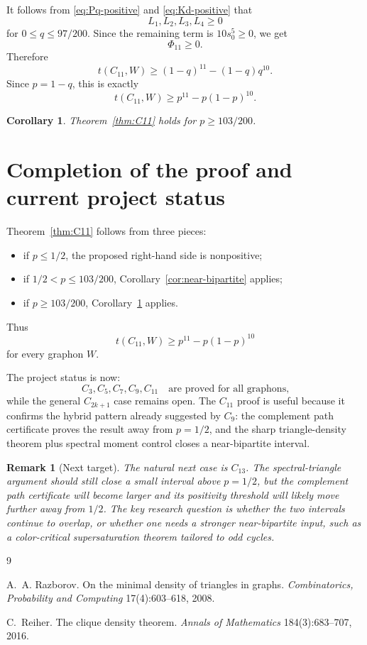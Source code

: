 \documentclass[11pt]{article}
\newtheorem{corollary}[theorem]{Corollary}
\newtheorem{remark}[theorem]{Remark}
\begin{document}
It follows from \eqref{eq:Pq-positive} and \eqref{eq:Kd-positive} that
\[
        L_1,L_2,L_3,L_4\ge0
\]
for $0\le q\le97/200$.  Since the remaining term is $10s_0^5\ge0$, we get
\[
        \Phi_{11}\ge0.
\]
Therefore
\[
        t(C_{11},W)
        \ge (1-q)^{11}-(1-q)q^{10}.
\]
Since $p=1-q$, this is exactly
\[
        t(C_{11},W)
        \ge p^{11}-p(1-p)^{10}.
\]

\begin{corollary}\label{cor:path-interval}
Theorem~\ref{thm:C11} holds for $p\ge103/200$.
\end{corollary}

\section{Completion of the proof and current project status}

Theorem~\ref{thm:C11} follows from three pieces:
\begin{itemize}[leftmargin=2em]
    \item if $p\le1/2$, the proposed right-hand side is nonpositive;
    \item if $1/2<p\le103/200$, Corollary~\ref{cor:near-bipartite} applies;
    \item if $p\ge103/200$, Corollary~\ref{cor:path-interval} applies.
\end{itemize}

Thus
\[
        t(C_{11},W)\ge p^{11}-p(1-p)^{10}
\]
for every graphon $W$.

The project status is now:
\[
        C_3,C_5,C_7,C_9,C_{11}
        \quad\text{are proved for all graphons,}
\]
while the general $C_{2k+1}$ case remains open.  The $C_{11}$ proof is useful because it confirms the hybrid pattern already suggested by $C_9$: the complement path certificate proves the result away from $p=1/2$, and the sharp triangle-density theorem plus spectral moment control closes a near-bipartite interval.

\begin{remark}[Next target]
The natural next case is $C_{13}$.  The spectral-triangle argument should still close a small interval above $p=1/2$, but the complement path certificate will become larger and its positivity threshold will likely move further away from $1/2$.  The key research question is whether the two intervals continue to overlap, or whether one needs a stronger near-bipartite input, such as a color-critical supersaturation theorem tailored to odd cycles.
\end{remark}

\begin{thebibliography}{9}

A.~A. Razborov.
\newblock On the minimal density of triangles in graphs.
\newblock \emph{Combinatorics, Probability and Computing} 17(4):603--618, 2008.

C.~Reiher.
\newblock The clique density theorem.
\newblock \emph{Annals of Mathematics} 184(3):683--707, 2016.

\end{thebibliography}
\end{document}

